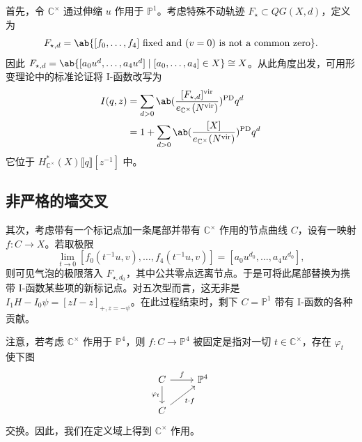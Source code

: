 \documentclass{amsart}
\theoremstyle{definition}
\theoremstyle{remark}
\theoremstyle{plain}
\theoremstyle{definition}
\theoremstyle{remark}
\newcommand{\C}{\mathbb{C}}
\renewcommand{\P}{\mathbb{P}}
\newcommand{\mr}[1]{\mathrm{#1}}
\newcommand{\1}{\mathbf{1}}
\newcommand{\2}{\mathbf{2}}
\newcommand{\3}{\mathbf{3}}
\newcommand{\vir}{\mr{vir}}
\newcommand{\ps}[1]{\llbracket #1 \rrbracket}
\begin{document}
首先，令 \(\C^{\times}\) 通过伸缩 \(u\) 作用于 \(\P^1\)。考虑特殊不动轨迹 \(F_{\star} \subset QG(X, d)\)，定义为
\[ F_{\star,d} = \ab\{ [f_0, \ldots, f_4] \text{ fixed and } (v=0) \text{ is not a common zero} \}. \]
因此 \(F_{\star,d} = \ab\{ [a_0 u^d, \ldots, a_4 u^d] \mid [a_0, \ldots, a_4] \in X \} \cong X\)。从此角度出发，可用形变理论中的标准论证将 I-函数改写为
\begin{align*}
    I(q,z) &= \sum_{d > 0} \ab(\frac{[F_{\star, d}]^{\vir}}{e_{\C^{\times}}(N^{\vir})})^{\mr{PD}} q^d \\
    &= 1 + \sum_{d > 0} \ab( \frac{[X]}{e_{\C^{\times}}(N^{\vir})})^{\mr{PD}} q^d
\end{align*}
它位于 \(H^*_{\C^{\times}}(X) \ps{q}[z^{-1}]\) 中。

\subsection{非严格的墙交叉}%
\label{sub:Wall-crossing without rigor}


其次，考虑带有一个标记点加一条尾部并带有 \(\C^{\times}\) 作用的节点曲线 \(C\)，设有一映射 \(f \colon C \to X\)。若取极限
\[ \lim_{t \to 0} [f_0(t^{-1}u, v), \ldots, f_4(t^{-1}u, v)] = [a_0 u^{d_0}, \ldots, a_4 u^{d_0}], \]
则可见气泡的极限落入 \(F_{\star, d_0}\)，其中公共零点远离节点。于是可将此尾部替换为携带 I-函数某些项的新标记点。对五次型而言，这无非是 \(I_1 H - I_0 \psi = [zI-z]_{+, z = -\psi}\)。在此过程结束时，剩下 \(C = \P^1\) 带有 I-函数的各种贡献。

注意，若考虑 \(\C^{\times}\) 作用于 \(\P^4\)，则 \(f \colon C \to \P^4\) 被固定是指对一切 \(t \in \C^{\times}\)，存在 \(\varphi_t\) 使下图
\begin{equation*}
\begin{tikzcd}
    C \ar{r}{f} \ar{d}[swap]{\varphi_t} & \P^4 \\
    C \ar{ur}[swap]{t \cdot f}
\end{tikzcd}
\end{equation*}
交换。因此，我们在定义域上得到 \(\C^{\times}\) 作用。
\end{document}
